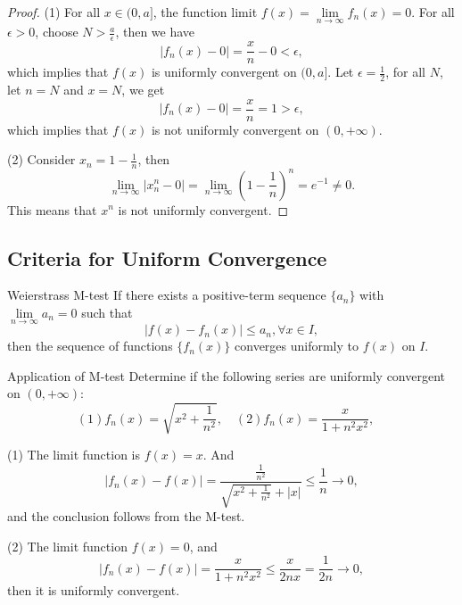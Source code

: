 \begin{proof}
  (1) For all $x \in (0, a]$, the function limit $f(x) = \lim \limits _{n
    \rightarrow \infty} f_n(x) = 0$. For all $\epsilon > 0$, choose $N >
  \frac{a}{\epsilon}$,
  then we have
  \begin{equation}
    |f_n(x) - 0| = \frac{x}{n} - 0 < \epsilon,
  \end{equation}
  which implies that $f(x)$ is uniformly convergent on $(0, a]$.
  Let $\epsilon = \frac{1}{2}$, for all $N$, let $n = N$ and $x = N$,
  we get
  \begin{equation}
    |f_n(x) - 0| = \frac{x}{n} = 1 > \epsilon,
  \end{equation}
  which implies that $f(x)$ is not uniformly convergent on $(0, +\infty)$.

  (2) Consider $x_n = 1 - \frac{1}{n}$, then
  \begin{equation}
    \lim \limits _{n \rightarrow \infty} |x_n^n - 0|
    = \lim \limits _{n \rightarrow \infty} (1 - \frac{1}{n})^n = e^{-1} \neq 0.
  \end{equation}
  This means that $x^n$ is not uniformly convergent.
\end{proof}

\subsection{Criteria for Uniform Convergence}

\begin{theorem}{Weierstrass M-test}{}
  If there exists a positive-term sequence $\{a_n\}$
  with $\lim \limits _{n \rightarrow \infty} a_n = 0$ such that
  \begin{equation}
    |f(x) - f_n(x)| \leq a_n, \forall x \in I,
  \end{equation}
  then the sequence of functions $\{f_n(x)\}$ converges uniformly to $f(x)$ on $I$.
\end{theorem}

\begin{example}{Application of M-test}{}
  Determine if the following series are uniformly convergent on $(0, +\infty)$:
  \begin{equation}
    (1) f_n(x) = \sqrt{x^2 + \frac{1}{n^2}}, \quad
    (2) f_n(x) = \frac{x}{1 + n^2x^2}, \quad
  \end{equation}
\end{example}

\begin{solution}
  (1) The limit function is $f(x) = x$.
  And
  \begin{equation}
    |f_n(x) - f(x)| = \frac{\frac{1}{n^2}}{\sqrt{x^2 + \frac{1}{n^2}} + |x|} \leq \frac{1}{n} \rightarrow 0,
  \end{equation}
  and the conclusion follows from the M-test.

  (2) The limit function $f(x) = 0$, and
  \begin{equation}
    |f_n(x) - f(x)| = \frac{x}{1 + n^2 x^2} \leq \frac{x}{2nx} = \frac{1}{2n} \rightarrow 0,
  \end{equation}
  then it is uniformly convergent.
\end{solution}

